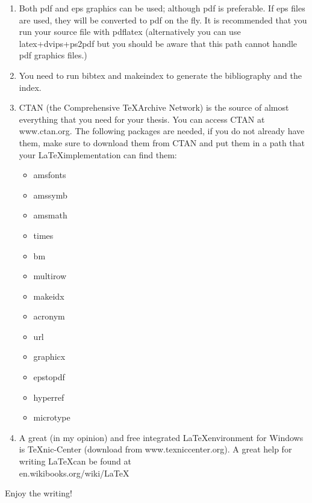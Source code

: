 \documentclass[11pt]{article}
\begin{document}
\begin{enumerate}
\item Both pdf and eps graphics can be used; although pdf is preferable. If eps files are used, they will be converted to pdf on the fly. It is recommended that you run your source file with pdflatex (alternatively you can use latex+dvips+ps2pdf but you should be aware that this path cannot handle pdf graphics files.)

\item You need to run bibtex and makeindex to generate the bibliography and
the index.

\item CTAN (the Comprehensive \TeX Archive Network) is the source of almost everything that you need for your thesis. You can access CTAN at
www.ctan.org. The following packages are needed, if you do not
already have them, make sure to download them from CTAN and put
them in a path that your \LaTeX implementation can find them:
\begin{itemize}

\item  amsfonts

\item  amssymb

\item  amsmath

\item  times

\item  bm

\item multirow

\item  makeidx

\item  acronym

\item url

\item  graphicx

\item  epstopdf

\item  hyperref

\item microtype

\end{itemize}

\item A great (in my opinion) and free integrated \LaTeX environment for Windows is TeXnic-Center (download from www.texniccenter.org).
    A great help for writing \LaTeX can be found  at\\ en.wikibooks.org/wiki/LaTeX

\end{enumerate}

Enjoy the writing!
\end{document}
